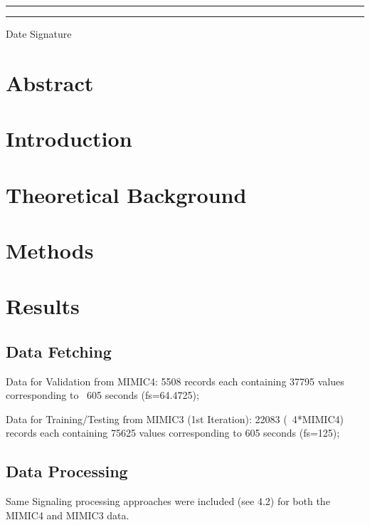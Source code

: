 \documentclass[12pt, bibliography=totoc]{scrartcl}
\begin{document}
    \rule{4cm}{0.5mm} \tab \rule{4cm}{0.5mm}

    Date \tab Signature

    \newpage
    \doublespacing
    \tableofcontents

    \newpage
    \onehalfspacing


    \section{Abstract}\label{sec:abstract}


    \section{Introduction}
    \label{sec:introduction}
    


    \section{Theoretical Background}
    \label{sec:background}
    


    \section{Methods}
    \label{sec:methods}
    


    \section{Results}
    \label{sec:results}

    \subsection{Data Fetching}
    \label{subsec:data_fetching}

    Data for Validation from MIMIC4:
    5508 records each containing 37795 values corresponding to ~605 seconds (fs=64.4725);

    Data for Training/Testing from MIMIC3 (1st Iteration):
    22083 (~4*MIMIC4) records each containing 75625 values corresponding to 605 seconds (fs=125);

    \subsection{Data Processing}
    \label{subsec:data_processing}

    Same Signaling processing approaches were included (see 4.2) for both the MIMIC4 and MIMIC3 data.
\end{document}
